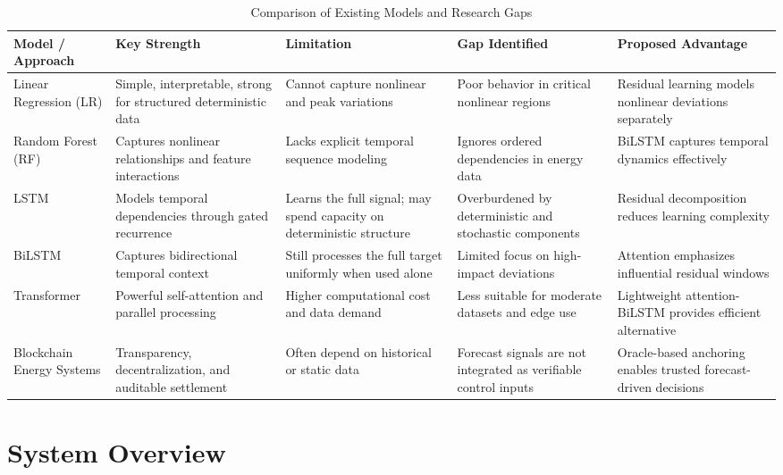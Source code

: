 \documentclass{ieeeaccess}
\begin{document}
\begin{table}[!t]
\caption{Comparison of Existing Models and Research Gaps}
\label{tab:gaps}
\centering
\begin{tabular}{p{2.8cm}p{3.2cm}p{3.2cm}p{3.2cm}p{3.2cm}}
\toprule
\textbf{Model / Approach} & \textbf{Key Strength} & \textbf{Limitation} & \textbf{Gap Identified} & \textbf{Proposed Advantage} \\
\midrule
Linear Regression (LR) & Simple, interpretable, strong for structured deterministic data & Cannot capture nonlinear and peak variations & Poor behavior in critical nonlinear regions & Residual learning models nonlinear deviations separately \\
\addlinespace
Random Forest (RF) & Captures nonlinear relationships and feature interactions & Lacks explicit temporal sequence modeling & Ignores ordered dependencies in energy data & BiLSTM captures temporal dynamics effectively \\
\addlinespace
LSTM & Models temporal dependencies through gated recurrence & Learns the full signal; may spend capacity on deterministic structure & Overburdened by deterministic and stochastic components & Residual decomposition reduces learning complexity \\
\addlinespace
BiLSTM & Captures bidirectional temporal context & Still processes the full target uniformly when used alone & Limited focus on high-impact deviations & Attention emphasizes influential residual windows \\
\addlinespace
Transformer & Powerful self-attention and parallel processing & Higher computational cost and data demand & Less suitable for moderate datasets and edge use & Lightweight attention-BiLSTM provides efficient alternative \\
\addlinespace
Blockchain Energy Systems & Transparency, decentralization, and auditable settlement & Often depend on historical or static data & Forecast signals are not integrated as verifiable control inputs & Oracle-based anchoring enables trusted forecast-driven decisions \\
\bottomrule
\end{tabular}
\end{table}


\section{System Overview}
\end{document}
